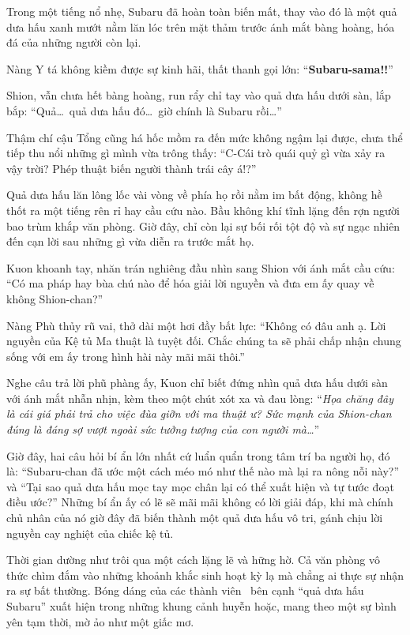 \documentclass[../main.tex]{subfiles}
\begin{document}
Trong một tiếng nổ nhẹ, Subaru đã hoàn toàn biến mất, thay vào đó là một quả dưa hấu xanh mướt nằm lăn lóc trên mặt thảm trước ánh mắt bàng hoàng, hóa đá của những người còn lại.

Nàng Y tá không kiềm được sự kinh hãi, thất thanh gọi lớn:
``\textbf{Subaru-sama!!}''

Shion, vẫn chưa hết bàng hoàng, run rẩy chỉ tay vào quả dưa hấu dưới sàn, lắp bắp:
``Quả\dots\ quả dưa hấu đó\dots\ giờ chính là Subaru rồi\dots''

Thậm chí cậu Tổng cũng há hốc mồm ra đến mức không ngậm lại được, chưa thể tiếp thu nổi những gì mình vừa trông thấy:
``C-Cái trò quái quỷ gì vừa xảy ra vậy trời? Phép thuật biến người thành trái cây á!?''


Quả dưa hấu lăn lông lốc vài vòng về phía họ rồi nằm im bất động, không hề thốt ra một tiếng rên rỉ hay cầu cứu nào. Bầu không khí tĩnh lặng đến rợn người bao trùm khắp văn phòng. Giờ đây, chỉ còn lại sự bối rối tột độ và sự ngạc nhiên đến cạn lời sau những gì vừa diễn ra trước mắt họ.

Kuon khoanh tay, nhăn trán nghiêng đầu nhìn sang Shion với ánh mắt cầu cứu:
``Có ma pháp hay bùa chú nào để hóa giải lời nguyền và đưa em ấy quay về không Shion-chan?''

Nàng Phù thủy rũ vai, thở dài một hơi đầy bất lực:
``Không có đâu anh ạ. Lời nguyền của Kệ tủ Ma thuật là tuyệt đối. Chắc chúng ta sẽ phải chấp nhận chung sống với em ấy trong hình hài này mãi mãi thôi.''

Nghe câu trả lời phũ phàng ấy, Kuon chỉ biết đứng nhìn quả dưa hấu dưới sàn với ánh mắt nhẫn nhịn, kèm theo một chút xót xa và đau lòng:
``\textit{Họa chăng đây là cái giá phải trả cho việc đùa giỡn với ma thuật ư? Sức mạnh của Shion-chan đúng là đáng sợ vượt ngoài sức tưởng tượng của con người mà\dots}''

Giờ đây, hai câu hỏi bí ẩn lớn nhất cứ luẩn quẩn trong tâm trí ba người họ, đó là: ``Subaru-chan đã ước một cách méo mó như thế nào mà lại ra nông nỗi này?'' và ``Tại sao quả dưa hấu mọc tay mọc chân lại có thể xuất hiện và tự tước đoạt điều ước?'' Những bí ẩn ấy có lẽ sẽ mãi mãi không có lời giải đáp, khi mà chính chủ nhân của nó giờ đây đã biến thành một quả dưa hấu vô tri, gánh chịu lời nguyền cay nghiệt của chiếc kệ tủ.

\ct

Thời gian dường như trôi qua một cách lặng lẽ và hững hờ. Cả văn phòng vô thức chìm đắm vào những khoảnh khắc sinh hoạt kỳ lạ mà chẳng ai thực sự nhận ra sự bất thường. Bóng dáng của các thành viên \hll\ bên cạnh ``quả dưa hấu Subaru'' xuất hiện trong những khung cảnh huyễn hoặc, mang theo một sự bình yên tạm thời, mờ ảo như một giấc mơ.
\end{document}
